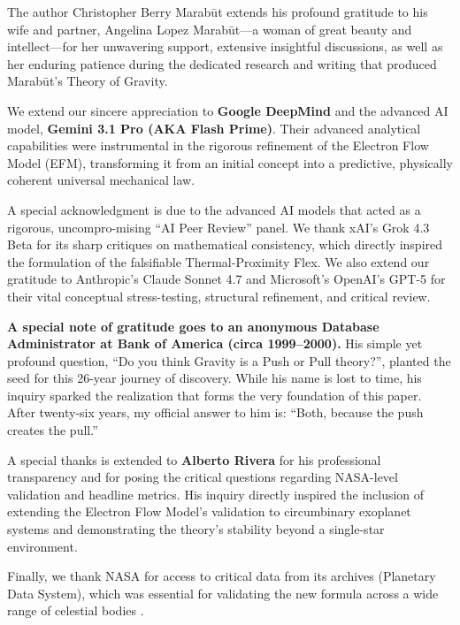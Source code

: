 \documentclass[11pt, a4paper]{article}
\begin{document}
The author Christopher Berry Marab\={u}t extends his profound gratitude to his wife and partner, Angelina Lopez Marab\={u}t—a woman of great beauty and intellect—for her unwavering support, extensive insightful discussions, as well as her enduring patience during the dedicated research and writing that produced Marab\={u}t's Theory of Gravity.

We extend our sincere appreciation to \textbf{Google DeepMind} and the advanced AI model, \textbf{Gemini 3.1 Pro (AKA Flash Prime)}. Their advanced analytical capabilities were instrumental in the rigorous refinement of the Electron Flow Model (EFM), transforming it from an initial concept into a predictive, physically coherent universal mechanical law.

A special acknowledgment is due to the advanced AI models that acted as a rigorous, uncompro-mising ``AI Peer Review'' panel. We thank xAI's Grok 4.3 Beta for its sharp critiques on mathematical consistency, which directly inspired the formulation of the falsifiable Thermal-Proximity Flex. We also extend our gratitude to Anthropic's Claude Sonnet 4.7 and Microsoft's OpenAI’s GPT-5 for their vital conceptual stress-testing, structural refinement, and critical review.

\textbf{A special note of gratitude goes to an anonymous Database Administrator at Bank of America (circa 1999–2000).} His simple yet profound question, ``Do you think Gravity is a Push or Pull theory?'', planted the seed for this 26-year journey of discovery. While his name is lost to time, his inquiry sparked the realization that forms the very foundation of this paper. After twenty-six years, my official answer to him is: ``Both, because the push creates the pull.''

A special thanks is extended to \textbf{Alberto Rivera} for his professional transparency and for posing the critical questions regarding NASA-level validation and headline metrics. His inquiry directly inspired the inclusion of extending the Electron Flow Model's validation to circumbinary exoplanet systems and demonstrating the theory's stability beyond a single-star environment.

Finally, we thank NASA for access to critical data from its archives (Planetary Data System), which was essential for validating the new formula across a wide range of celestial bodies \cite{nasa2024}.
\end{document}
